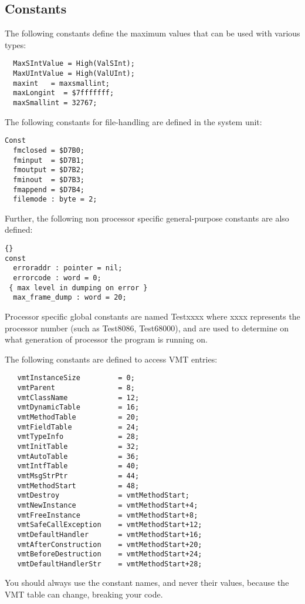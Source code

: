 \documentclass{report}
\begin{document}
\subsection{Constants}
The following constants define the maximum values that can be used with
various types:
\begin{verbatim}
  MaxSIntValue = High(ValSInt);
  MaxUIntValue = High(ValUInt);
  maxint   = maxsmallint;
  maxLongint  = $7fffffff;
  maxSmallint = 32767;
\end{verbatim}
The following constants for file-handling are defined in the system unit:
\begin{verbatim}
Const
  fmclosed = $D7B0;
  fminput  = $D7B1;
  fmoutput = $D7B2;
  fminout  = $D7B3;
  fmappend = $D7B4;
  filemode : byte = 2;
\end{verbatim}
Further, the following non processor specific general-purpose constants
are also defined:
\begin{lstlisting}{}
const
  erroraddr : pointer = nil;
  errorcode : word = 0;
 { max level in dumping on error }
  max_frame_dump : word = 20;
\end{lstlisting}{}
\begin{remark}
Processor specific global constants are named Testxxxx where xxxx 
represents the processor number (such as Test8086, Test68000),
and are used to determine on what generation of processor the program
is running on.
\end{remark}
The following constants are defined to access VMT entries:
\begin{verbatim}
   vmtInstanceSize         = 0;
   vmtParent               = 8;
   vmtClassName            = 12;
   vmtDynamicTable         = 16;
   vmtMethodTable          = 20;
   vmtFieldTable           = 24;
   vmtTypeInfo             = 28;
   vmtInitTable            = 32;
   vmtAutoTable            = 36;
   vmtIntfTable            = 40;
   vmtMsgStrPtr            = 44;
   vmtMethodStart          = 48;
   vmtDestroy              = vmtMethodStart;
   vmtNewInstance          = vmtMethodStart+4;
   vmtFreeInstance         = vmtMethodStart+8;
   vmtSafeCallException    = vmtMethodStart+12;
   vmtDefaultHandler       = vmtMethodStart+16;
   vmtAfterConstruction    = vmtMethodStart+20;
   vmtBeforeDestruction    = vmtMethodStart+24;
   vmtDefaultHandlerStr    = vmtMethodStart+28;
\end{verbatim}
You should always use the constant names, and never their values, because
the VMT table can change, breaking your code.
\end{document}
